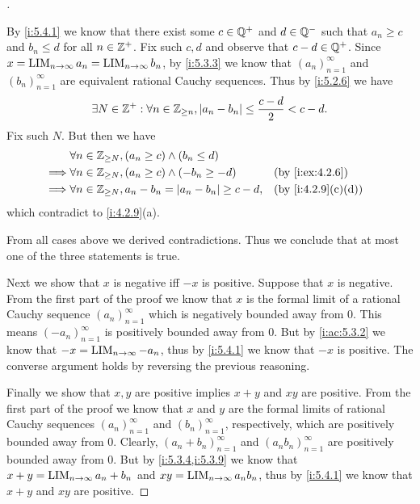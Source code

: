 \begin{proof}[]
\begin{itemize}
          By \cref{i:5.4.1} we know that there exist some \(c \in \mathbb{Q}^+\) and \(d \in \mathbb{Q}^-\) such that \(a_n \geq c\) and \(b_n \leq d\) for all \(n \in \mathbb{Z}^+\).
          Fix such \(c, d\) and observe that \(c - d \in \mathbb{Q}^+\).
          Since \(x = \operatorname*{LIM}_{n \to \infty} a_n = \operatorname*{LIM}_{n \to \infty} b_n\), by \cref{i:5.3.3} we know that \((a_n)_{n = 1}^\infty\) and \((b_n)_{n = 1}^\infty\) are equivalent rational Cauchy sequences.
          Thus by \cref{i:5.2.6} we have
          \[
            \exists N \in \mathbb{Z}^+ : \forall n \in \mathbb{Z}_{\geq n}, \left\lvert a_n - b_n\right\rvert \leq \dfrac{c - d}{2} < c - d.
          \]
          Fix such \(N\).
          But then we have
          \begin{align*}
                     & \forall n \in \Z_{\geq N}, (a_n \geq c) \land (b_n \leq d)                                \\
            \implies & \forall n \in \Z_{\geq N}, (a_n \geq c) \land (-b_n \geq -d)       &  & \by{i:ex:4.2.6}   \\
            \implies & \forall n \in \Z_{\geq N}, a_n - b_n = \abs{a_n - b_n} \geq c - d, &  & \by{i:4.2.9}[c,d]
          \end{align*}
          which contradict to \cref{i:4.2.9}(a).
  \end{itemize}
  From all cases above we derived contradictions.
  Thus we conclude that at most one of the three statements is true.

  Next we show that \(x\) is negative iff \(-x\) is positive.
  Suppose that \(x\) is negative.
  From the first part of the proof we know that \(x\) is the formal limit of a rational Cauchy sequence \((a_n)_{n = 1}^\infty\) which is negatively bounded away from \(0\).
  This means \((-a_n)_{n = 1}^\infty\) is positively bounded away from \(0\).
  But by \cref{i:ac:5.3.2} we know that \(-x = \operatorname*{LIM}_{n \to \infty} -a_n\), thus by \cref{i:5.4.1} we know that \(-x\) is positive.
  The converse argument holds by reversing the previous reasoning.

  Finally we show that \(x, y\) are positive implies \(x + y\) and \(xy\) are positive.
  From the first part of the proof we know that \(x\) and \(y\) are the formal limits of rational Cauchy sequences \((a_n)_{n = 1}^\infty\) and \((b_n)_{n = 1}^\infty\), respectively, which are positively bounded away from \(0\).
  Clearly, \((a_n + b_n)_{n = 1}^\infty\) and \((a_n b_n)_{n = 1}^\infty\) are positively bounded away from \(0\).
  But by \cref{i:5.3.4,i:5.3.9} we know that \(x + y = \operatorname*{LIM}_{n \to \infty} a_n + b_n\) and \(xy = \operatorname*{LIM}_{n \to \infty} a_n b_n\), thus by \cref{i:5.4.1} we know that \(x + y\) and \(xy\) are positive.
\end{proof}

